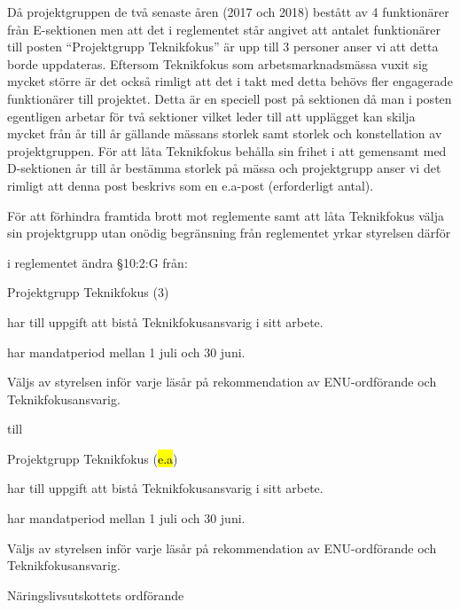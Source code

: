 \documentclass[../_main/handlingar.tex]{subfiles}
\begin{document}

Då projektgruppen de två senaste åren (2017 och 2018) bestått av 4 funktionärer från E-sektionen men att det i reglementet står angivet att antalet funktionärer till posten “Projektgrupp Teknikfokus” är upp till 3 personer anser vi att detta borde uppdateras. Eftersom Teknikfokus som arbetsmarknadsmässa vuxit sig mycket större är det också rimligt att det i takt med detta behövs fler engagerade funktionärer till projektet. Detta är en speciell post på sektionen då man i posten egentligen arbetar för två sektioner vilket leder till att upplägget kan skilja mycket från år till år gällande mässans storlek samt storlek och konstellation av projektgruppen. För att låta Teknikfokus behålla sin frihet i att gemensamt med D-sektionen år till år bestämma storlek på mässa och projektgrupp anser vi det rimligt att denna post beskrivs som en e.a-post (erforderligt antal).

För att förhindra framtida brott mot reglemente samt att låta Teknikfokus välja sin projektgrupp utan onödig begränsning från reglementet yrkar styrelsen därför

\begin{attsatser}
  \att i reglementet ändra \S10:2:G från:\par
  \begin{emptylist}
    \item Projektgrupp Teknikfokus (3)
      \begin{dashlist}
        \item har till uppgift att bistå Teknikfokusansvarig i sitt arbete.
        \item har mandatperiod mellan 1 juli och 30 juni.
        \item Väljs av styrelsen inför varje läsår på rekommendation av ENU-ordförande och Teknikfokusansvarig. 
      \end{dashlist}
    \end{emptylist}
    
    till 
    
    \begin{emptylist}
    \item Projektgrupp Teknikfokus (\hl{e.a})
      \begin{dashlist}
        \item har till uppgift att bistå Teknikfokusansvarig i sitt arbete.
        \item har mandatperiod mellan 1 juli och 30 juni.
        \item Väljs av styrelsen inför varje läsår på rekommendation av ENU-ordförande och Teknikfokusansvarig. 
      \end{dashlist}
    \end{emptylist}
  \changenote
\end{attsatser}

\begin{signatures}{1}
    \ist
    \signature{\enuordf}{Näringslivsutskottets ordförande}
\end{signatures}
\end{document}
